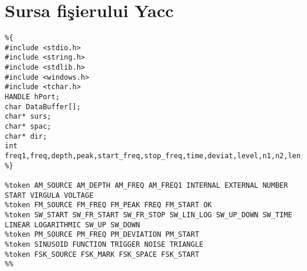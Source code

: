 
\chapter{Sursa fi\c{s}ierului Yacc}
\label{AnexaB}

\begin{lstlisting}
%{
#include <stdio.h>
#include <string.h>
#include <stdlib.h>
#include <windows.h>
#include <tchar.h>
HANDLE hPort;
char DataBuffer[];
char* surs;
char* spac;
char* dir;
int freq1,freq,depth,peak,start_freq,stop_freq,time,deviat,level,n1,n2,len;
%}

%token AM_SOURCE AM_DEPTH AM_FREQ AM_FREQ1 INTERNAL EXTERNAL NUMBER START VIRGULA VOLTAGE
%token FM_SOURCE FM_FREQ FM_PEAK FREQ FM_START OK
%token SW_START SW_FR_START SW_FR_STOP SW_LIN_LOG SW_UP_DOWN SW_TIME LINEAR LOGARITHMIC SW_UP SW_DOWN
%token PM_SOURCE PM_FREQ PM_DEVIATION PM_START
%token SINUSOID FUNCTION TRIGGER NOISE TRIANGLE
%token FSK_SOURCE FSK_MARK FSK_SPACE FSK_START
%%


\end{lstlisting}

